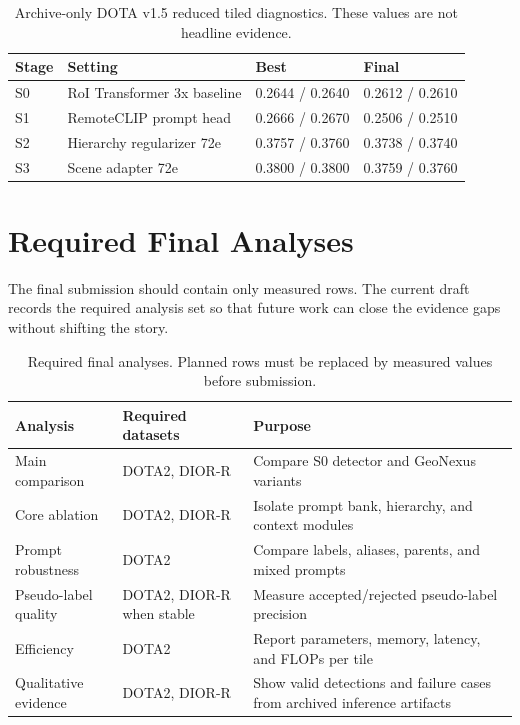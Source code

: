 \documentclass[10pt]{article}
\begin{document}
\begin{table}[t]
\centering
\small
\caption{Archive-only DOTA v1.5 reduced tiled diagnostics. These values are not headline evidence.}
\label{tab:archive}
\begin{tabular}{llll}
\toprule
Stage & Setting & Best & Final \\
\midrule
S0 & RoI Transformer 3x baseline & 0.2644 / 0.2640 & 0.2612 / 0.2610 \\
S1 & RemoteCLIP prompt head & 0.2666 / 0.2670 & 0.2506 / 0.2510 \\
S2 & Hierarchy regularizer 72e & 0.3757 / 0.3760 & 0.3738 / 0.3740 \\
S3 & Scene adapter 72e & 0.3800 / 0.3800 & 0.3759 / 0.3760 \\
\bottomrule
\end{tabular}
\end{table}

\section{Required Final Analyses}

The final submission should contain only measured rows. The current draft records the required analysis set so that future work can close the evidence gaps without shifting the story.

\begin{table}[t]
\centering
\small
\caption{Required final analyses. Planned rows must be replaced by measured values before submission.}
\label{tab:protocol}
\begin{tabular}{lll}
\toprule
Analysis & Required datasets & Purpose \\
\midrule
Main comparison & DOTA2, DIOR-R & Compare S0 detector and GeoNexus variants \\
Core ablation & DOTA2, DIOR-R & Isolate prompt bank, hierarchy, and context modules \\
Prompt robustness & DOTA2 & Compare labels, aliases, parents, and mixed prompts \\
Pseudo-label quality & DOTA2, DIOR-R when stable & Measure accepted/rejected pseudo-label precision \\
Efficiency & DOTA2 & Report parameters, memory, latency, and FLOPs per tile \\
Qualitative evidence & DOTA2, DIOR-R & Show valid detections and failure cases from archived inference artifacts \\
\bottomrule
\end{tabular}
\end{table}
\end{document}
